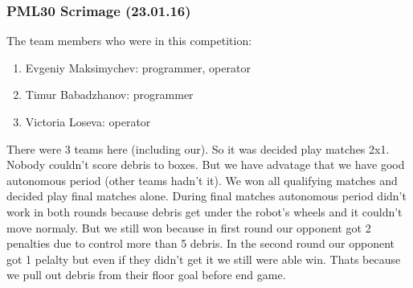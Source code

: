 \subsubsection{PML30 Scrimage (23.01.16)}
The team members who were in this competition:
\begin{enumerate}
	\item Evgeniy Maksimychev: programmer, operator 
	
	\item Timur Babadzhanov: programmer
	
	\item Victoria Loseva: operator
\end{enumerate}
There were 3 teams here (including our). So it was decided play matches 2x1. Nobody couldn't score debris to boxes. But we have advatage that we have good autonomous period (other teams hadn't it).\newline
We won all qualifying matches and decided play final matches alone. During final matches autonomous period didn't work in both rounds because debris get under the robot's wheels and it couldn't move normaly. But we still won because in first round our opponent got 2 penalties due to control more than 5 debris. In the second round our opponent got 1 pelalty but even if they didn't get it we still were able win. Thats because we pull out debris from their floor goal before end game.\newline
\fillpage